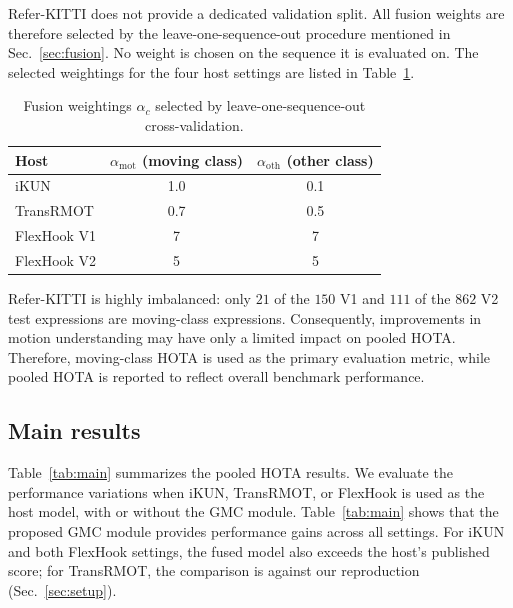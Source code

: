 \documentclass{article}
\begin{document}
Refer-KITTI does not provide a dedicated validation split. All fusion weights are therefore selected by the leave-one-sequence-out procedure mentioned in Sec.~\ref{sec:fusion}. No weight is chosen on the sequence it is evaluated on. The selected weightings for the four host settings are listed in Table~\ref{tab:alphas}.

\begin{table}[b]
  \centering
  \caption{Fusion weightings $\alpha_c$ selected by leave-one-sequence-out cross-validation.}
  \label{tab:alphas}
  \footnotesize
  \begin{tabular*}{\linewidth}{@{\extracolsep{\fill}}lcc}
    \hline
    Host        & $\alpha_{\mathrm{mot}}$ (moving class) & $\alpha_{\mathrm{oth}}$ (other class) \\
    \hline
    iKUN        & 1.0 & 0.1 \\
    TransRMOT   & 0.7 & 0.5 \\
    FlexHook V1 & 7   & 7   \\
    FlexHook V2 & 5   & 5   \\
    \hline
  \end{tabular*}
\end{table}

Refer-KITTI is highly imbalanced: only $21$ of the $150$ V1 and $111$ of the $862$ V2 test expressions are moving-class expressions. Consequently, improvements in motion understanding may have only a limited impact on pooled HOTA. Therefore, moving-class HOTA is used as the primary evaluation metric, while pooled HOTA is reported to reflect overall benchmark performance.

\subsection{Main results}
\label{sec:main}
Table~\ref{tab:main} summarizes the pooled HOTA results. We evaluate the performance variations when iKUN, TransRMOT, or FlexHook is used as the host model, with or without the GMC module. Table~\ref{tab:main} shows that the proposed GMC module provides performance gains across all settings. For iKUN and both FlexHook settings, the fused model also exceeds the host's published score; for TransRMOT, the comparison is against our reproduction (Sec.~\ref{sec:setup}).
\end{document}
